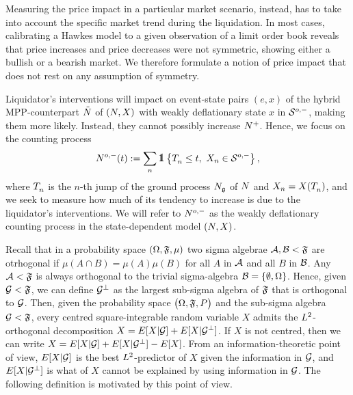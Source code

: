 \documentclass[10pt]{article}
\begin{document}
Measuring the price impact in a particular market scenario, instead, has to take into account the specific market trend during the liquidation. In most cases, calibrating a Hawkes model to a given observation of a limit order book reveals that price increases and price decreases were not symmetric, showing either a bullish or a bearish market. We therefore formulate a notion of price impact that does not rest on any assumption of symmetry. 

Liquidator's interventions will impact on event-state pairs $(e,x)$ of the hybrid MPP-counterpart $\hybridHawkes$ of $\sdHawkesPair$ with weakly deflationary state $x$ in $\weakDeflSpace$, making them more likely. Instead, they cannot possibly increase $\Nplus$. Hence, we focus on the counting process 
\begin{equation}\label{eq.weakly_deflationary_coutning_process}
 \weakDeflPP (t) : = \sum_{n}\one\left\lbrace
 \arrivalTimes[]_n \leq t, \, \, \stateVariable_n \in \weakDeflSpace
 \right\rbrace,
\end{equation}
where $\arrivalTimes[]_n$ is the $n$-th jump of the ground process $\groundProc$ of $\multiCountingProc$ and $\stateVariable_n = \stateVariable(\arrivalTimes[]_n)$, and we seek to measure how much of its tendency to increase is due to the liquidator's interventions. We will refer to $\weakDeflPP$ as the weakly deflationary counting process in the state-dependent model $\sdHawkesPair$.

Recall that in a probability space $(\Omega,\sigmaAlgebra,\mu)$ two sigma algebrae $\setAlgebraA, \setAlgebraB < \sigmaAlgebra$ are otrhogonal if $\mu(A\cap B)=\mu(A)\mu(B)$ for all $A$ in $\setAlgebraA$ and all $B$ in $\setAlgebraB$. Any $\setAlgebraA < \sigmaAlgebra$ is always orthogonal to the trivial sigma-algebra $\setAlgebraB = \lbrace \emptyset, \Omega\rbrace$. Hence, given $\sigmaAlgebraG < \sigmaAlgebra$, we can define
$\sigmaAlgebraG\orthogonal$ as the largest sub-sigma algebra of $\sigmaAlgebra$ that is orthogonal to $\sigmaAlgebraG$. Then, given the probability space $\probabilitySpace$ and the sub-sigma algebra $\sigmaAlgebraG < \sigmaAlgebra$, every centred square-integrable random variable $X$ admits the $\Ltwo$-orthogonal decomposition $X = \Expectation[X\vert \sigmaAlgebraG] + \Expectation[X\vert\sigmaAlgebraG\orthogonal]$.
If $X$ is not centred, then we can write $X = \Expectation[X\vert \sigmaAlgebraG] + \Expectation[X\vert\sigmaAlgebraG\orthogonal] - \Expectation[X]$.
From an information-theoretic point of view, $\Expectation[X\vert\sigmaAlgebraG]$ is the best $\Ltwo$-predictor of $X$ given the information in $\sigmaAlgebraG$, and $\Expectation[X\vert\sigmaAlgebraG\orthogonal]$ is what of $X$ cannot be explained by using information in $\sigmaAlgebraG$. The following definition is motivated by this point of view. 
\end{document}
